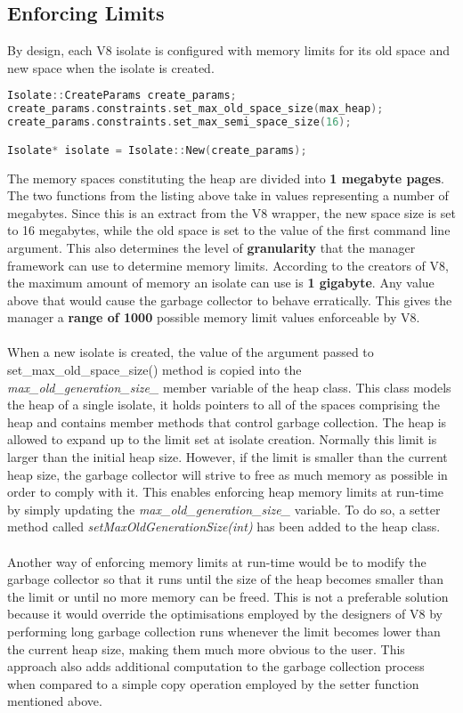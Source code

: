 \documentclass{l4proj}
\begin{document}
\subsection{Enforcing Limits}
\hspace*{3em} By design, each V8 isolate is configured with memory limits for its old space and new space when the isolate is created.
\begin{lstlisting}[language=cpp]
Isolate::CreateParams create_params;
create_params.constraints.set_max_old_space_size(max_heap);
create_params.constraints.set_max_semi_space_size(16);

Isolate* isolate = Isolate::New(create_params);
\end{lstlisting}
\hspace*{3em} The memory spaces constituting the heap are divided into \textbf{1 megabyte pages}. The two functions from the listing above take in values representing a number of megabytes. Since this is an extract from the V8 wrapper, the new space size is set to 16 megabytes, while the old space is set to the value of the first command line argument. This also determines the level of \textbf{granularity} that the manager framework can use to determine memory limits. According to the creators of V8, the maximum amount of memory an isolate can use is \textbf{1 gigabyte}. Any value above that would cause the garbage collector to behave erratically.\cite{v8sizebug} This gives the manager a \textbf{range of 1000} possible memory limit values enforceable by V8.
\\\\
\hspace*{3em} When a new isolate is created, the value of the argument passed to set\_max\_old\_space\_size() method is copied into the \textit{max\_old\_generation\_size\_} member variable of the heap class. This class models the heap of a single isolate, it holds pointers to all of the spaces comprising the heap and contains member methods that control garbage collection. The heap is allowed to expand up to the limit set at isolate creation. Normally this limit is larger than the initial heap size. However, if the limit is smaller than the current heap size, the garbage collector will strive to free as much memory as possible in order to comply with it. This enables enforcing heap memory limits at run-time by simply updating the  \textit{max\_old\_generation\_size\_} variable. To do so, a setter method called \textit{setMaxOldGenerationSize(int)} has been added to the heap class.  %
\\\\
\hspace*{3em} Another way of enforcing memory limits at run-time would be to modify the garbage collector so that it runs until the size of the heap becomes smaller than the limit or until no more memory can be freed. This is not a preferable solution because it would override the optimisations employed by the designers of V8 by performing long garbage collection runs whenever the limit becomes lower than the current heap size, making them much more obvious to the user. This approach also adds additional computation to the garbage collection process when compared to a simple copy operation employed by the setter function mentioned above.
\end{document}

